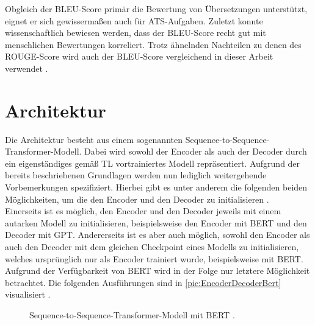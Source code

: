 \noindent
Obgleich der \ac{BLEU}-Score primär die Bewertung von Übersetzungen unterstützt, eignet er sich gewissermaßen auch für \ac{ATS}-Aufgaben. Zuletzt konnte wissenschaftlich bewiesen werden, dass der \ac{BLEU}-Score recht gut mit menschlichen Bewertungen korreliert. Trotz ähnelnden Nachteilen zu denen des \ac{ROUGE}-Score wird auch der \ac{BLEU}-Score vergleichend in dieser Arbeit verwendet \cite[S.~6-7]{PAP02}.


\section{Architektur}
\noindent
Die Architektur besteht aus einem sogenannten Sequence-to-Sequence-Transformer-Modell. Dabei wird sowohl der Encoder als auch der Decoder durch ein eigenständiges gemäß \ac{TL} vortrainiertes Modell repräsentiert. Aufgrund der bereits beschriebenen Grundlagen werden nun lediglich weitergehende Vorbemerkungen spezifiziert. Hierbei gibt es unter anderem die folgenden beiden Möglichkeiten, um die den Encoder und den Decoder zu initialisieren \cite[S.~2]{ROT20}.\\

\noindent
Einerseits ist es möglich, den Encoder und den Decoder jeweils mit einem autarken Modell zu initialisieren, beispielsweise den Encoder mit \ac{BERT} und den Decoder mit \ac{GPT}. Andererseits ist es aber auch möglich, sowohl den Encoder als auch den Decoder mit dem gleichen Checkpoint eines Modells zu initialisieren, welches ursprünglich nur als Encoder trainiert wurde, beispielsweise mit \ac{BERT}. Aufgrund der Verfügbarkeit von \ac{BERT} wird in der Folge nur letztere Möglichkeit betrachtet. Die folgenden Ausführungen sind in \autoref{pic:EncoderDecoderBert} visualisiert \cite[S.~2-3]{ROT20}.
\newpage

\begin{figure}[h!]
  \centering
  \caption{Sequence-to-Sequence-Transformer-Modell mit BERT \cite{VON20}.}
  \label{pic:EncoderDecoderBert}
\end{figure}

